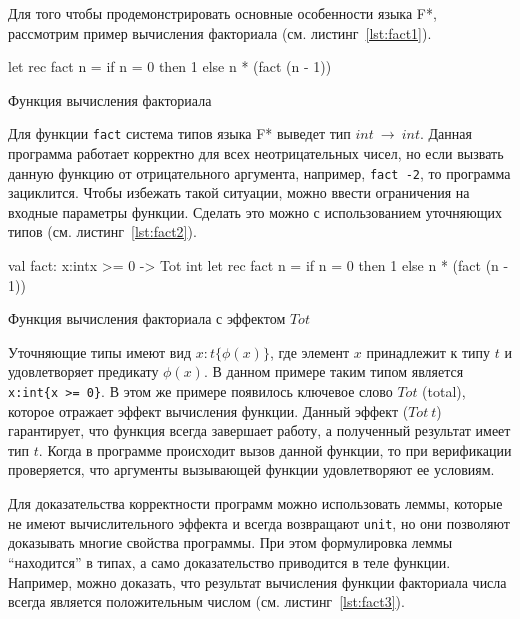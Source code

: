 Для того чтобы продемонстрировать основные особенности языка F*, рассмотрим пример вычисления факториала (см. листинг~\ref{lst:fact1}). 

\begin{listing}
\begin{pyglist}[language=ocaml,numbers=none,numbersep=5pt, fontsize=\small]
let rec fact n =
    if n = 0 then 1 else n * (fact (n - 1))  
\end{pyglist}
\caption{Функция вычисления факториала}
\label{lst:fact1}  
\end{listing}

Для функции \verb|fact| система типов языка F* выведет тип $int ~\to~ int$. Данная программа работает корректно для всех неотрицательных чисел, но если вызвать данную функцию от отрицательного аргумента, например, \verb|fact -2|, то программа зациклится. Чтобы избежать такой ситуации, можно ввести ограничения на входные параметры функции. Сделать это можно с использованием уточняющих типов (см. листинг~\ref{lst:fact2}).

\begin{listing} 
\begin{pyglist}[language=ocaml,numbers=none,numbersep=5pt, fontsize=\small]
val fact: x:int{x >= 0} -> Tot int
let rec fact n =
    if n = 0 then 1 else n * (fact (n - 1))  
\end{pyglist}
\caption{Функция вычисления факториала с эффектом $Tot$}
\label{lst:fact2}   
\end{listing}

Уточняющие типы имеют вид $x:t\{\phi(x)\}$, где элемент $x$ принадлежит к типу $t$ и удовлетворяет предикату $\phi(x)$. В данном примере таким типом является \verb|x:int{x >= 0}|. В этом же примере появилось ключевое слово $Tot$ (total), которое отражает эффект вычисления функции. Данный эффект ($Tot~t$) гарантирует, что функция всегда завершает работу, а полученный результат имеет тип $t$. Когда в программе происходит вызов данной функции, то при верификации проверяется, что аргументы вызывающей функции удовлетворяют ее условиям.

Для доказательства корректности программ можно использовать леммы, которые не имеют вычислительного эффекта и всегда возвращают \verb|unit|, но они позволяют доказывать многие свойства программы. При этом формулировка леммы ``находится'' в типах, а само доказательство приводится в теле функции. Например, можно доказать, что результат вычисления функции факториала числа всегда является положительным числом (см. листинг~\ref{lst:fact3}).

